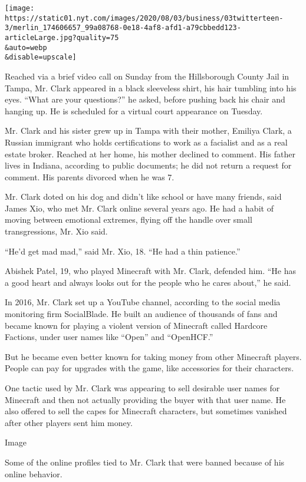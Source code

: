 \texttt{[image: https://static01.nyt.com/images/2020/08/03/business/03twitterteen-3/merlin\_174606657\_99a08768-0e18-4af8-afd1-a79cbbedd123-articleLarge.jpg?quality=75\\\&auto=webp\\\&disable=upscale]}

Reached via a brief video call on Sunday from the Hillsborough County
Jail in Tampa, Mr. Clark appeared in a black sleeveless shirt, his hair
tumbling into his eyes. ``What are your questions?'' he asked, before
pushing back his chair and hanging up. He is scheduled for a virtual
court appearance on Tuesday.

Mr. Clark and his sister grew up in Tampa with their mother, Emiliya
Clark, a Russian immigrant who holds certifications to work as a
facialist and as a real estate broker. Reached at her home, his mother
declined to comment. His father lives in Indiana, according to public
documents; he did not return a request for comment. His parents divorced
when he was 7.

Mr. Clark doted on his dog and didn't like school or have many friends,
said James Xio, who met Mr. Clark online several years ago. He had a
habit of moving between emotional extremes, flying off the handle over
small transgressions, Mr. Xio said.

``He'd get mad mad,'' said Mr. Xio, 18. ``He had a thin patience.''

Abishek Patel, 19, who played Minecraft with Mr. Clark, defended him.
``He has a good heart and always looks out for the people who he cares
about,'' he said.

In 2016, Mr. Clark set up a YouTube channel, according to the social
media monitoring firm SocialBlade. He built an audience of thousands of
fans and became known for playing a violent version of Minecraft called
Hardcore Factions, under user names like ``Open'' and ``OpenHCF.''

But he became even better known for taking money from other Minecraft
players. People can pay for upgrades with the game, like accessories for
their characters.

One tactic used by Mr. Clark was appearing to sell desirable user names
for Minecraft and then not actually providing the buyer with that user
name. He also offered to sell the capes for Minecraft characters, but
sometimes vanished after other players sent him money.

Image

Some of the online profiles tied to Mr. Clark that were banned because
of his online behavior.

